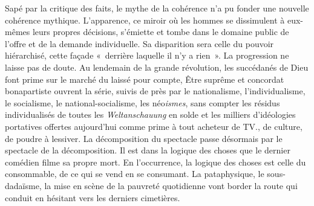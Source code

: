 \documentclass[french,twoside]{book} %
\begin{document}
Sapé par la critique des faits, le mythe de la cohérence n’a pu fonder une nouvelle cohérence mythique. L’apparence, ce miroir où les hommes se dissimulent à eux-mêmes leurs propres décisions, s’émiette et tombe dans le domaine public de l’offre et de la demande individuelle. Sa disparition sera celle du pouvoir hiérarchisé, cette façade « derrière laquelle il n’y a rien ». La progression ne laisse pas de doute. Au lendemain de la grande révolution, les succédanés de Dieu font prime sur le marché du laissé pour compte, Être suprême et concordat bonapartiste ouvrent la série, suivis de près par le nationalisme, l’individualisme, le socialisme, le national-socialisme, les néo\emph{ismes}, sans compter les résidus individualisés de toutes les \emph{Weltanschauung} en solde et les milliers d’idéologies portatives offertes aujourd’hui comme prime à tout acheteur de TV., de culture, de poudre à lessiver. La décomposition du spectacle passe désormais par le spectacle de la décomposition. Il est dans la logique des choses que le dernier comédien filme sa propre mort. En l’occurrence, la logique des choses est celle du consommable, de ce qui se vend en se consumant. La pataphysique, le sous-dadaïsme, la mise en scène de la pauvreté quotidienne vont border la route qui conduit en hésitant vers les derniers cimetières.
\end{document}
